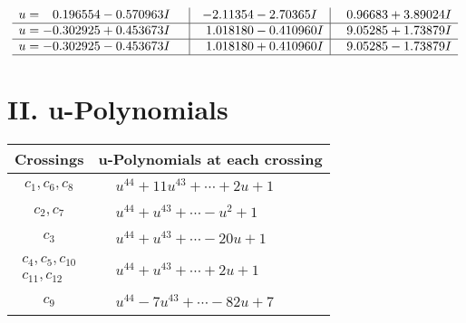\documentclass[1p]{elsarticle_modified}
\theoremstyle{definition}
\begin{document}
$$\begin{array}{c|c|c}
\begin{aligned}
u &= \phantom{-}0.196554 - 0.570963 I\end{aligned}
 & -2.11354 - 2.70365 I & \phantom{-}0.96683 + 3.89024 I \\ \hline\begin{aligned}
u &= -0.302925 + 0.453673 I\end{aligned}
 & \phantom{-}1.018180 - 0.410960 I & \phantom{-}9.05285 + 1.73879 I \\ \hline\begin{aligned}
u &= -0.302925 - 0.453673 I\end{aligned}
 & \phantom{-}1.018180 + 0.410960 I & \phantom{-}9.05285 - 1.73879 I\\
 \hline 
 \end{array}$$\newpage
\newpage\renewcommand{\arraystretch}{1}
\centering \section*{ II. u-Polynomials}
\begin{tabular}{m{50pt}|m{274pt}}
Crossings & \hspace{64pt}u-Polynomials at each crossing \\
\hline $$\begin{aligned}c_{1},c_{6},c_{8}\end{aligned}$$&$\begin{aligned}
&u^{44}+11 u^{43}+\cdots+2 u+1
\end{aligned}$\\
\hline $$\begin{aligned}c_{2},c_{7}\end{aligned}$$&$\begin{aligned}
&u^{44}+u^{43}+\cdots- u^2+1
\end{aligned}$\\
\hline $$\begin{aligned}c_{3}\end{aligned}$$&$\begin{aligned}
&u^{44}+u^{43}+\cdots-20 u+1
\end{aligned}$\\
\hline $$\begin{aligned}c_{4},c_{5},c_{10}\\c_{11},c_{12}\end{aligned}$$&$\begin{aligned}
&u^{44}+u^{43}+\cdots+2 u+1
\end{aligned}$\\
\hline $$\begin{aligned}c_{9}\end{aligned}$$&$\begin{aligned}
&u^{44}-7 u^{43}+\cdots-82 u+7
\end{aligned}$\\
\hline
\end{tabular}\newpage\renewcommand{\arraystretch}{1}
\end{document}
